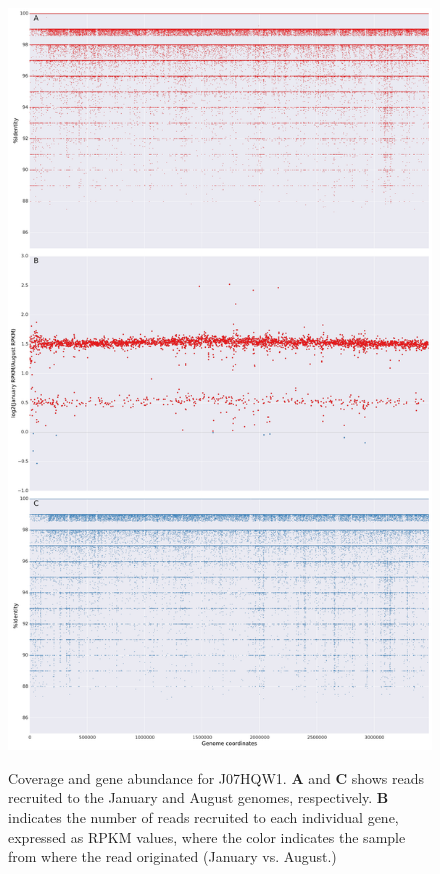\begin{figure}[!hbtp]
  \centering
  \includegraphics[width=\textwidth,height=\textheight,keepaspectratio]{Chapter5/Figures/coverage_plots/J07HWQ1_coverage.pdf}
  \label{J07HWQ1coverage}
  \caption{Coverage and gene abundance for J07HQW1. \textbf{A} and \textbf{C} shows reads recruited to the January and August genomes, respectively. \textbf{B} indicates the number of reads recruited to each individual gene, expressed as RPKM values, where the color indicates the sample from where the read originated (January vs. August.)}
\end{figure}

